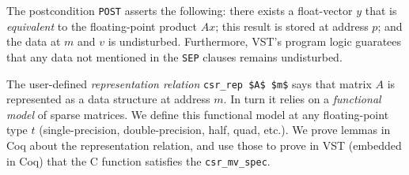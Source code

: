 The postcondition \lstinline{POST} asserts the following:  
there exists a float-vector $y$
that is \emph{equivalent} to the 
floating-point product $Ax$;
this result is stored at address $p$;
and the data at $m$ and $v$ is
undisturbed.  Furthermore, VST's program logic guaratees that any data not mentioned in the \lstinline{SEP} clauses remains undisturbed.

The user-defined \emph{representation relation}
\lstinline{csr_rep $A$ $m$} says that matrix $A$ is
represented as a data structure at address $m$.
In turn it relies on a \emph{functional model} of 
sparse matrices.  We define this functional model at any
floating-point type $t$ (single-precision, double-precision,
half, quad, etc.). We prove lemmas in Coq about the
representation relation, and use those to prove in VST (embedded in Coq)
that the C function satisfies the
\lstinline{csr_mv_spec}.


  
  
